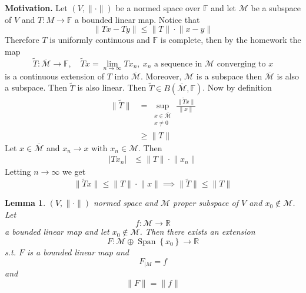 \documentclass[11pt,a4paper]{article}
\theoremstyle{definition}
\theoremstyle{plain}
\newtheorem{lemma}[definition]{Lemma}
\theoremstyle{remark}
\newcommand{\F}{\mathbb{F}}
\newcommand{\R}{\mathbb{R}}
\renewcommand{\set}[1]{\left\{ #1 \right\}}
\newcommand{\abs}[1]{\lvert #1 \rvert}
\newcommand{\norm}[1]{\lVert #1 \rVert}
\newcommand{\1}{\mathbbm{1}}
\newcommand{\Span}{\operatorname{Span}}
\begin{document}
\textbf{Motivation.} Let $(V, \norm{\cdot})$ be a normed space over $\F$ and let $\mathcal{M}$ be a subspace of $V$ and $T \colon M \to \F$ a bounded linear map. 
Notice that 
$$\norm{Tx - Ty} \le \norm{T} \cdot \norm{x - y}$$
Therefore $T$ is uniformly continuous and $\F$ is complete, then by the homework the map 
$$\tilde{T} \colon \overline{\mathcal{M}} \to \F, \quad \tilde{T} x = \lim_{n \to \infty} Tx_n, \ x_n \text{ a sequence in $\mathcal{M}$ converging to $x$}$$
is a continuous extension of $T$ into $\overline{\mathcal{M}}$. Moreover, $\mathcal{M}$ is a subspace then $\overline{\mathcal{M}}$ is also a subspace. Then $\tilde{T}$ is also 
linear. Then $\tilde{T} \in B(\overline{\mathcal{M}}, \F)$. Now by definition 
\begin{align*}
    \norm{\tilde{T}} &= \sup_{\substack{x \in \overline{\mathcal{M}} \\ x \ne 0}}\frac{\norm{\tilde{T} x}}{\norm{x}} \\
    &\ge \norm{T}
\end{align*}
Let $x \in \overline{\mathcal{M}}$ and $x_n \to x$ with $x_n \in \mathcal{M}$. Then 
\begin{align*}
    \abs{Tx_n} &\le \norm{T} \cdot \norm{x_n} 
\end{align*} 
Letting $n \to \infty$ we get 
$$\norm{\tilde{T} x} \le \norm{T} \cdot \norm{x} \implies \norm{\tilde{T}} \le \norm{T}$$

\begin{lemma}
    $(V, \norm{\cdot})$ normed space and $\mathcal{M}$ proper subspace of $V$ and $x_0 \not\in \mathcal{M}$. Let 
    $$f \colon \mathcal{M} \to \R$$ 
    a bounded linear map and let $x_0 \not\in \mathcal{M}$. Then there exists an extension 
    $$F \colon \mathcal{M} \oplus \Span \set{x_0} \to \R$$
    s.t. $F$ is a bounded linear map and 
    $$F_{|M} = f$$
    and 
    $$\norm{F} = \norm{f}$$
\end{lemma}
\end{document}
